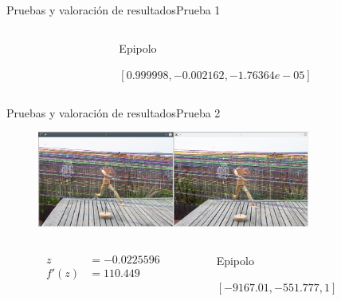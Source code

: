 \documentclass[14pt,spanish]{beamer}
\begin{document}
\begin{frame}{Pruebas y valoración de resultados}{Prueba 1}
\begin{overlayarea}{\textwidth}{8cm}
{\begin{columns}
\begin{column}{0.2\textwidth}
                \end{column}
                \begin{column}{0.8\textwidth}
                  Epipolo

                  $[0.999998, -0.002162, -1.76364e-05]$
                \end{column}
              \end{columns}

              }

          \end{overlayarea}
      \end{frame}

      \begin{frame}{Pruebas y valoración de resultados}{Prueba 2}
        \begin{overlayarea}{\textwidth}{8cm}
             {\begin{figure}[ht!]
              \centering
              \includegraphics[width=0.8\textwidth]{../Informe/Monigote-Normal.png}
            \end{figure}

            \begin{columns}
              \begin{column}{0.2\textwidth}
                \begin{align*}
                  z &= -0.0225596 \\
                  f'(z) &= 110.449
                \end{align*}
              \end{column}
              \begin{column}{0.8\textwidth}
                Epipolo

                $[-9167.01, -551.777, 1]$
              \end{column}
            \end{columns}


            }
\end{overlayarea}
\end{frame}
\end{document}
